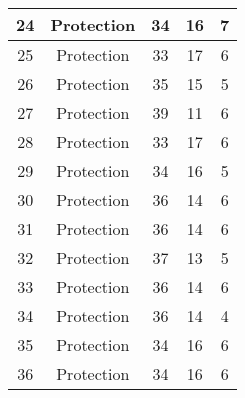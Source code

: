 \documentclass[results.tex]{subfiles}
\begin{document}
\begin{center}
\begin{tabular}{| c || c | c | c | c |}
            \hline
            24                      & Protection                   & 34                     & 16                      & 7                    \\
            \hline
            25                      & Protection                   & 33                     & 17                      & 6                    \\
            \hline
            26                      & Protection                   & 35                     & 15                      & 5                    \\
            \hline
            27                      & Protection                   & 39                     & 11                      & 6                    \\
            \hline
            28                      & Protection                   & 33                     & 17                      & 6                    \\
            \hline
            29                      & Protection                   & 34                     & 16                      & 5                    \\
            \hline
            30                      & Protection                   & 36                     & 14                      & 6                    \\
            \hline
            31                      & Protection                   & 36                     & 14                      & 6                    \\
            \hline
            32                      & Protection                   & 37                     & 13                      & 5                    \\
            \hline
            33                      & Protection                   & 36                     & 14                      & 6                    \\
            \hline
            34                      & Protection                   & 36                     & 14                      & 4                    \\
            \hline
            35                      & Protection                   & 34                     & 16                      & 6                    \\
            \hline
            36                      & Protection                   & 34                     & 16                      & 6                    \\

\end{tabular}
\end{center}
\end{document}
